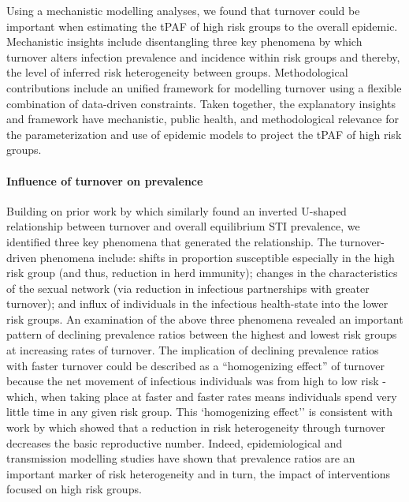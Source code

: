 Using a mechanistic modelling analyses, 
we found that turnover could be important 
when estimating the tPAF
of high risk groups to the overall epidemic.
Mechanistic insights include disentangling 
three key phenomena by which turnover 
alters infection prevalence and incidence within risk groups and 
thereby, the level of inferred risk heterogeneity between groups.
Methodological contributions include an unified 
framework for modelling turnover 
using a flexible combination of data-driven constraints.
Taken together, the explanatory insights and framework
have mechanistic, public health, and methodological relevance 		%
for the parameterization
and use of epidemic models to project the tPAF of high risk groups.

\paragraph{Influence of turnover on prevalence}				%

Building on prior work by \citep{Stigum1994,Zhang2012,Henry2015}
which similarly found an inverted 
U-shaped relationship between
turnover and overall equilibrium STI prevalence, 
we identified three key phenomena that generated the relationship.
The turnover-driven phenomena include: 
shifts in proportion susceptible especially in the high risk group (and thus, reduction in herd immunity); 
changes in the characteristics of the sexual network (via reduction in infectious partnerships with greater turnover); 
and influx of individuals in the infectious health-state into the lower risk groups.
An examination of the above three phenomena revealed an important pattern 
of declining prevalence ratios between the highest and lowest risk groups at increasing rates of turnover. 
The implication of declining prevalence ratios with faster turnover could 
be described as a ``homogenizing effect'' of turnover because the 
net movement of infectious individuals was
from high to low risk - which, when taking place at faster and faster rates 
means individuals spend
very little time in any given risk group.			%
This `homogenizing effect'' is consistent with work by 
\citet{Henry2015} which showed that
 a reduction in risk heterogeneity through turnover
decreases the basic reproductive number.
Indeed, epidemiological and transmission modelling studies have shown that prevalence ratios 
are an important marker of risk heterogeneity and in turn, 
the impact of interventions focused on high risk groups. %


